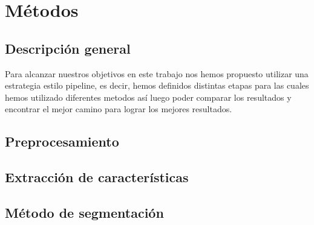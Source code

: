 
\chapter{M\'etodos} %

\label{Chapter3} %


\section{Descripci\'on general}

Para alcanzar nuestros objetivos en este trabajo nos hemos propuesto utilizar una estrategia estilo pipeline, es decir, hemos definidos distintas etapas para las cuales hemos utilizado diferentes metodos así luego poder comparar los resultados y encontrar el mejor camino para lograr los mejores resultados.

\section{Preprocesamiento}

\section{Extracci\'on de caracter\'isticas}

\section{M\'etodo de segmentaci\'on}
